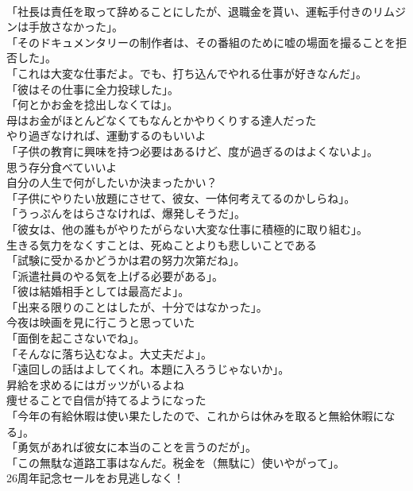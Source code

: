 \documentclass[8pt]{extreport}
\begin{document}
\begin{CJK}{UTF8}{min}
\\	「社長は責任を取って辞めることにしたが、退職金を貰い、運転手付きのリムジンは手放さなかった」。	
\\	「そのドキュメンタリーの制作者は、その番組のために嘘の場面を撮ることを拒否した」。	
\\	「これは大変な仕事だよ。でも、打ち込んでやれる仕事が好きなんだ」。	
\\	「彼はその仕事に全力投球した」。	
\\	「何とかお金を捻出しなくては」。	
\\	母はお金がほとんどなくてもなんとかやりくりする達人だった	
\\	やり過ぎなければ、運動するのもいいよ	
\\	「子供の教育に興味を持つ必要はあるけど、度が過ぎるのはよくないよ」。	
\\	思う存分食べていいよ	
\\	自分の人生で何がしたいか決まったかい？	
\\	「子供にやりたい放題にさせて、彼女、一体何考えてるのかしらね」。	
\\	「うっぷんをはらさなければ、爆発しそうだ」。	
\\	「彼女は、他の誰もがやりたがらない大変な仕事に積極的に取り組む」。	
\\	生きる気力をなくすことは、死ぬことよりも悲しいことである	
\\	「試験に受かるかどうかは君の努力次第だね」。	
\\	「派遣社員のやる気を上げる必要がある」。	
\\	「彼は結婚相手としては最高だよ」。	
\\	「出来る限りのことはしたが、十分ではなかった」。	
\\	今夜は映画を見に行こうと思っていた	
\\	「面倒を起こさないでね」。	
\\	「そんなに落ち込むなよ。大丈夫だよ」。	
\\	「遠回しの話はよしてくれ。本題に入ろうじゃないか」。	
\\	昇給を求めるにはガッツがいるよね	
\\	痩せることで自信が持てるようになった	
\\	「今年の有給休暇は使い果たしたので、これからは休みを取ると無給休暇になる」。	
\\	「勇気があれば彼女に本当のことを言うのだが」。	
\\	「この無駄な道路工事はなんだ。税金を（無駄に）使いやがって」。	
\\	26周年記念セールをお見逃しなく！	

\end{CJK}
\end{document}

